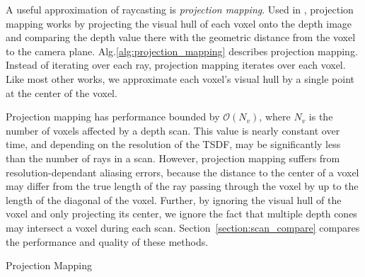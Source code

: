 \documentclass[conference]{IEEEtran}
\newcommand{\sref}[1]{Section~\ref{#1}}
\newcommand{\algoref}[1]{Alg.\ref{#1}}
\newcommand{\TSDF}{TSDF\xspace}
\begin{document}
A useful approximation of raycasting is \textit{projection mapping}. Used in
\cite{Newcombe,Nguyen2012, Bylow2013, Klingensmith2014}, projection mapping
works by projecting the visual hull of each voxel onto the depth image and
comparing the depth value there with the geometric distance from the voxel to
the camera plane. \algoref{alg:projection_mapping} describes projection mapping.
Instead of iterating over each ray, projection mapping iterates over each voxel.
Like most other works, we approximate each voxel's visual hull by a single point
at the center of the voxel.

Projection mapping has performance bounded by $\mathcal{O}(N_v)$, where $N_v$ is
the number of voxels affected by a depth scan. This value is nearly constant
over time, and depending on the resolution of the \TSDF, may be significantly
less than the number of rays in a scan. However, projection mapping suffers from
resolution-dependant aliasing errors, because the distance to the center of a
voxel may differ from the true length of the ray passing through the voxel by up
to the length of the diagonal of the voxel. Further, by ignoring the visual
hull of the voxel and only projecting its center, we ignore the fact that
multiple depth cones may intersect a voxel during each scan.
\sref{section:scan_compare} compares the performance and quality of these methods.

\begin{algorithm} 
	\caption{Projection Mapping}
	\label{alg:projection_mapping}
	\begin{algorithmic}[1]
		 
		  
	     
		    	\label{alg:line:voxel_carve}
			\EndIf
	    \EndIf
		  
			\label{alg:line:tsdf_update}
		\EndIf
	\EndFor
	\end{algorithmic}
\end{algorithm}
\end{document}
